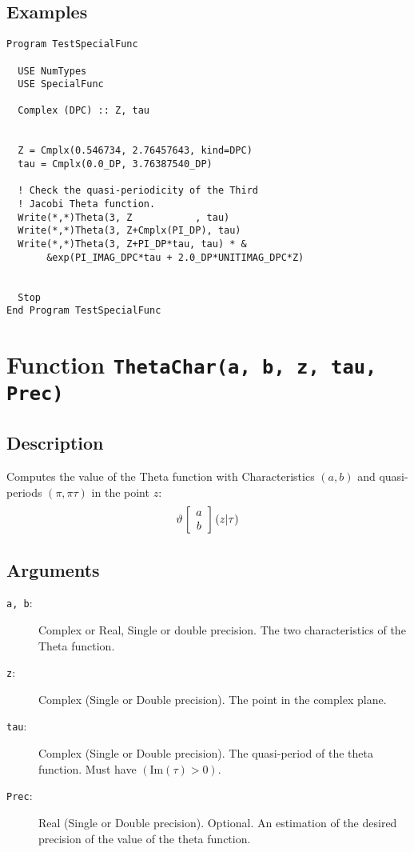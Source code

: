 \subsection{Examples}

\begin{verbatim}
Program TestSpecialFunc

  USE NumTypes
  USE SpecialFunc

  Complex (DPC) :: Z, tau


  Z = Cmplx(0.546734, 2.76457643, kind=DPC)
  tau = Cmplx(0.0_DP, 3.76387540_DP)

  ! Check the quasi-periodicity of the Third
  ! Jacobi Theta function.
  Write(*,*)Theta(3, Z           , tau)
  Write(*,*)Theta(3, Z+Cmplx(PI_DP), tau)
  Write(*,*)Theta(3, Z+PI_DP*tau, tau) * &
       &exp(PI_IMAG_DPC*tau + 2.0_DP*UNITIMAG_DPC*Z)


  Stop
End Program TestSpecialFunc

\end{verbatim}


\section{Function \texttt{ThetaChar(a, b, z, tau, Prec)}}

\subsection{Description}

Computes the value of the Theta function with Characteristics $(a,b)$
and quasi-periods $(\pi,\pi\tau)$ in the point $z$:
\begin{equation}
  \vartheta\left[ \begin{array}{c} a \\ b \end{array}\right]\left(z|\tau\right)
\end{equation}

\subsection{Arguments}

\begin{description}
\item[\texttt{a, b}:] Complex or Real, Single or double precision. The
  two characteristics of the Theta function.
\item[\texttt{z}:] Complex (Single or Double precision). The point in
  the complex plane.
\item[\texttt{tau}:] Complex (Single or Double precision). The
  quasi-period of the theta function. Must have $(\textrm{Im}(\tau)>0)$.
\item[\texttt{Prec}:] Real (Single or Double precision). Optional. An
  estimation of the desired precision of the value of the theta
  function. 
\end{description}


